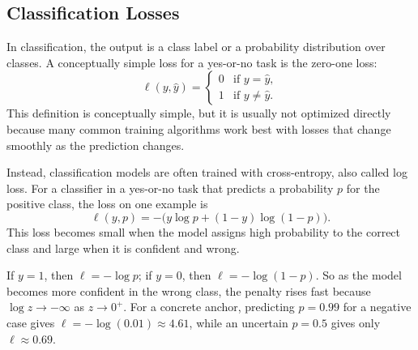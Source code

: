 \subsection{Classification Losses}

In classification, the output is a class label or a probability distribution over classes. A conceptually simple loss for a yes-or-no task is the zero-one loss:
\[
\ell(y,\hat{y}) =
\begin{cases}
0 & \text{if } y=\hat{y},\\
1 & \text{if } y\neq \hat{y}.
\end{cases}
\]
This definition is conceptually simple, but it is usually not optimized directly because many common training algorithms work best with losses that change smoothly as the prediction changes.

Instead, classification models are often trained with cross-entropy, also called log loss. For a classifier in a yes-or-no task that predicts a probability $p$ for the positive class, the loss on one example is
\[
\ell(y,p) = -\bigl(y \log p + (1-y)\log(1-p)\bigr).
\]
This loss becomes small when the model assigns high probability to the correct class and large when it is confident and wrong.

\begin{mathlens}
If $y=1$, then $\ell=-\log p$; if $y=0$, then $\ell=-\log(1-p)$. So as the model becomes more confident in the wrong class, the penalty rises fast because $\log z \to -\infty$ as $z \to 0^+$. For a concrete anchor, predicting $p=0.99$ for a negative case gives $\ell=-\log(0.01)\approx 4.61$, while an uncertain $p=0.5$ gives only $\ell\approx 0.69$.
\end{mathlens}

